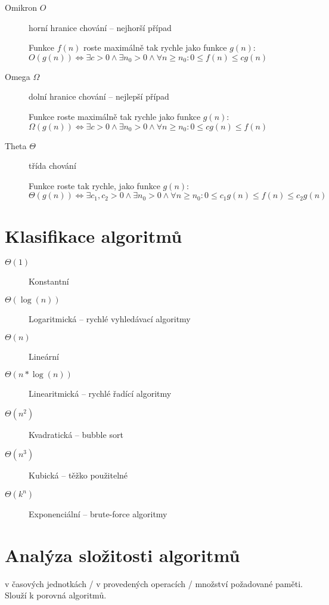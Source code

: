 \documentclass[a4paper, 11pt]{report}
\begin{document}
\begin{description}
	\item[Omikron $O$] horní hranice chování -- nejhorší případ
	
	Funkce $f(n)$ roste maximálně tak rychle jako funkce $g(n)$:\\
	$O(g(n)) \iff \exists c > 0 \land \exists n_0 > 0 \land \forall n \geq n_0: 0 \leq f(n) \leq c g(n) $
	\item[Omega $\Omega$] dolní hranice chování -- nejlepší případ
	
	Funkce roste maximálně tak rychle jako funkce $g(n)$:\\
	$\Omega(g(n)) \iff \exists c > 0 \land \exists n_0 > 0 \land \forall n \geq n_0: 0 \leq c g(n) \leq f(n)$
	
	\item[Theta $\Theta$] třída chování
	
	Funkce roste tak rychle, jako funkce $g(n)$:\\
	$\Theta(g(n)) \iff \exists c_1,c_2 > 0 \land \exists n_0 > 0 \land \forall n \geq n_0: 0 \leq c_1 g(n) \leq f(n) \leq c_2 g(n)$
	
\end{description}

\section{Klasifikace algoritmů}
\begin{description}
	\item[$\Theta( 1 )$] Konstantní
	\item[$\Theta( \log(n) )$] Logaritmická -- rychlé vyhledávací algoritmy
	\item[$\Theta( n )$] Lineární
	\item[$\Theta( n * \log(n) )$] Linearitmická -- rychlé řadící algoritmy
	\item[$\Theta( n^2 )$] Kvadratická -- bubble sort
	\item[$\Theta( n^3 )$] Kubická -- těžko použitelné
	\item[$\Theta( k^n )$] Exponenciální -- brute-force algoritmy
	
\end{description}


\section{Analýza složitosti algoritmů}

v časových jednotkách / v provedených operacích / množství požadované paměti. Slouží k porovná algoritmů.
\end{document}
